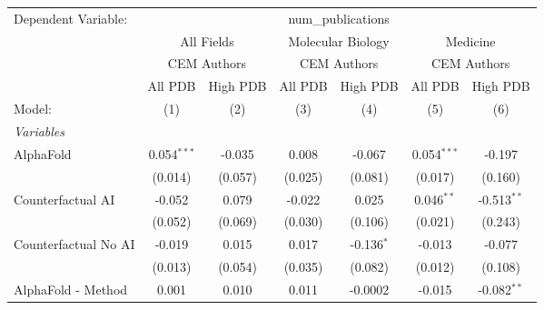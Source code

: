\begingroup
\centering
\begin{tabular}{lcccccc}
   \tabularnewline \midrule \midrule
   Dependent Variable: & \multicolumn{6}{c}{num\_publications}\\
 & \multicolumn{2}{c}{All Fields} & \multicolumn{2}{c}{Molecular Biology} & \multicolumn{2}{c}{Medicine} \\
\cmidrule(lr){2-3} \cmidrule(lr){4-5} \cmidrule(lr){6-7}
 & \multicolumn{2}{c}{CEM Authors} & \multicolumn{2}{c}{CEM Authors} & \multicolumn{2}{c}{CEM Authors} \\
\cmidrule(lr){2-3} \cmidrule(lr){4-5} \cmidrule(lr){6-7}
 & \multicolumn{1}{c}{All PDB} & \multicolumn{1}{c}{High PDB} & \multicolumn{1}{c}{All PDB} & \multicolumn{1}{c}{High PDB} & \multicolumn{1}{c}{All PDB} & \multicolumn{1}{c}{High PDB} \\
\cmidrule(lr){2-2} \cmidrule(lr){3-3} \cmidrule(lr){4-4} \cmidrule(lr){5-5} \cmidrule(lr){6-6} \cmidrule(lr){7-7}
   Model:                                                     & (1)           & (2)          & (3)           & (4)          & (5)           & (6)\\  
   \midrule
   \emph{Variables}\\
   AlphaFold                                                  & 0.054$^{***}$ & -0.035       & 0.008         & -0.067       & 0.054$^{***}$ & -0.197\\   
                                                              & (0.014)       & (0.057)      & (0.025)       & (0.081)      & (0.017)       & (0.160)\\   
   Counterfactual AI                                          & -0.052        & 0.079        & -0.022        & 0.025        & 0.046$^{**}$  & -0.513$^{**}$\\   
                                                              & (0.052)       & (0.069)      & (0.030)       & (0.106)      & (0.021)       & (0.243)\\   
   Counterfactual No AI                                       & -0.019        & 0.015        & 0.017         & -0.136$^{*}$ & -0.013        & -0.077\\   
                                                              & (0.013)       & (0.054)      & (0.035)       & (0.082)      & (0.012)       & (0.108)\\   
   AlphaFold - Method                                         & 0.001         & 0.010        & 0.011         & -0.0002      & -0.015        & -0.082$^{**}$\\   

\end{tabular}

